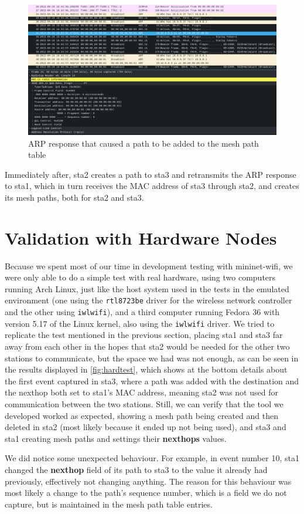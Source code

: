 \begin{figure}[htb]
   \centering
   \includegraphics[scale=.35]{capsta3}
   \caption{\ac{ARP} response that caused a path to be added to the mesh path table}\label{fig:capsta3}
\end{figure}

Immediately after, sta2 creates a path to sta3 and retransmits the \ac{ARP}
response to sta1, which in turn receives the \ac{MAC} address of sta3 through
sta2, and creates its mesh paths, both for sta2 and sta3.


\section{Validation with Hardware Nodes}\label{sect:valid}

Because we spent most of our time in development testing with mininet-wifi, we
were only able to do a simple test with real hardware, using two computers
running Arch Linux, just like the host system used in the tests in the emulated
environment (one using the \texttt{rtl8723be} driver for the wireless network
controller and the other using \texttt{iwlwifi}), and a third computer running
Fedora 36 with version 5.17 of the Linux kernel, also using the \texttt{iwlwifi}
driver. We tried to replicate the test mentioned in the previous section,
placing sta1 and sta3 far away from each other in the hopes that sta2 would be
needed for the other two stations to communicate, but the space we had was not
enough, as can be seen in the results displayed in \autoref{fig:hardtest}, which
shows at the bottom details about the first event captured in sta3, where a path
was added with the destination and the nexthop both set to sta1's \ac{MAC}
address, meaning sta2 was not used for communication between the two stations.
Still, we can verify that the tool we developed worked as expected, showing a
mesh path being created and then deleted in sta2 (most likely because it ended
up not being used), and sta3 and sta1 creating mesh paths and settings their
\textbf{nexthops} values.

We did notice some unexpected behaviour. For example, in event number 10, sta1
changed the \textbf{nexthop} field of its path to sta3 to the value it already
had previously, effectively not changing anything. The reason for this behaviour
was most likely a change to the path's sequence number, which is a field we do
not capture, but is maintained in the mesh path table entries.
